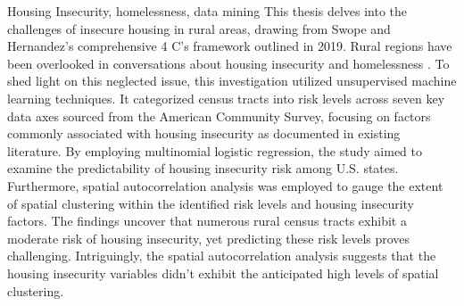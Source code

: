 
\begin{abstract}
This thesis explores rural housing insecurity through Swope and Hernandez’s (2019) 4 C's of housing insecurity in rural areas. Little attention has been paid to rural areas in the conversation on housing insecurity and houselessness \citep{gleason_using_2021}. To facilitate further discussion on this understudied issue, this exploratory study used unsupervised machine learning to group census tracts into risk levels across seven axes of data from the American Community Survey. The axes were based on housing insecurity factors found in the literature. \textit{K}-medoids clustering is used to group census tracts into high, medium, and low risk of housing insecurity for each axes. Multinomial logistic regression was used to determine variation between U.S. states based on how well state risk levels could be predicted with the national dataset. Furthermore, spatial autocorrelation analysis was employed to gauge the extent of spatial clustering within the identified risk levels and housing insecurity factors. The results indicate that many rural census tracts have a medium risk of housing insecurity, and the risk levels are hard to predict. The spatial autocorrelation results show that the housing insecurity variables were not as highly spatially clustered as expected.  
\end{abstract}

\begin{layabstract}{Housing Insecurity, homelessness, data mining}	%
This thesis delves into the challenges of insecure housing in rural areas, drawing from Swope and Hernandez's comprehensive 4 C's framework outlined in 2019. Rural regions have been overlooked in conversations about housing insecurity and homelessness \citep{gleason_using_2021}. To shed light on this neglected issue, this investigation utilized unsupervised machine learning techniques. It categorized census tracts into risk levels across seven key data axes sourced from the American Community Survey, focusing on factors commonly associated with housing insecurity as documented in existing literature. By employing multinomial logistic regression, the study aimed to examine the predictability of housing insecurity risk among U.S. states. Furthermore, spatial autocorrelation analysis was employed to gauge the extent of spatial clustering within the identified risk levels and housing insecurity factors. The findings uncover that numerous rural census tracts exhibit a moderate risk of housing insecurity, yet predicting these risk levels proves challenging. Intriguingly, the spatial autocorrelation analysis suggests that the housing insecurity variables didn't exhibit the anticipated high levels of spatial clustering.


\end{layabstract}

